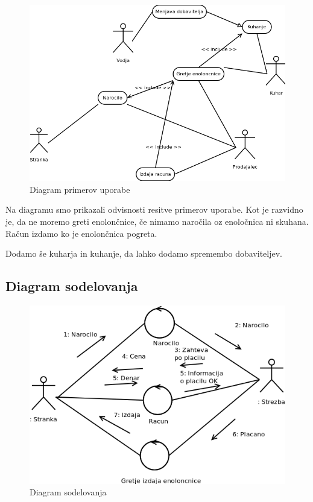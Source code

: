 \documentclass[12pt]{article}
\begin{document}
\begin{figure}[htb]
\begin{center}
\includegraphics[scale=0.5]{primer_uporabe.png}
\end{center}
\caption{Diagram primerov uporabe}
\label{primer_uporabe}
\end{figure}

Na diagramu smo prikazali odvisnosti resitve primerov uporabe. Kot je razvidno je, da ne moremo greti enolončnice, če nimamo naročila oz enoločnica ni skuhana. Račun izdamo ko je enolončnica pogreta. 

Dodamo še kuharja in kuhanje, da lahko dodamo spremembo dobaviteljev.

\newpage

\subsection{Diagram sodelovanja}

\begin{figure}[htb]
\begin{center}
\includegraphics[scale=0.5]{sodelovanja.png}
\end{center}
\caption{Diagram sodelovanja}
\label{sodelovanja}
\end{figure}
\end{document}

